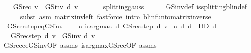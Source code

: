 \begin{isabellebody}
\ \ \isamarkupfalse%
\ {\isachardoublequoteopen}GS{\isacharunderscore}{\kern0pt}rec\ v\ {\isacharequal}{\kern0pt}\ GS{\isacharunderscore}{\kern0pt}inv\ d\ v{\isachardoublequoteclose}\ \isanewline
\ \ \ \ \isamarkupfalse%
\ splitting{\isacharunderscore}{\kern0pt}gauss\isanewline
\ \ \ \ \isamarkupfalse%
\ GS{\isacharunderscore}{\kern0pt}inv{\isacharunderscore}{\kern0pt}def\ is{\isacharunderscore}{\kern0pt}splitting{\isacharunderscore}{\kern0pt}blin{\isacharunderscore}{\kern0pt}def{\isacharprime}{\kern0pt}\isanewline
\ \ \ \ \isamarkupfalse%
\ {\isacharparenleft}{\kern0pt}subst\ {\isacharparenleft}{\kern0pt}asm{\isacharparenright}{\kern0pt}\ matrix{\isacharunderscore}{\kern0pt}inv{\isacharunderscore}{\kern0pt}left{\isacharparenright}{\kern0pt}\ {\isacharparenleft}{\kern0pt}fastforce\ intro{\isacharcolon}{\kern0pt}\ blinfun{\isacharunderscore}{\kern0pt}to{\isacharunderscore}{\kern0pt}matrix{\isacharunderscore}{\kern0pt}inverse{\isacharparenleft}{\kern0pt}{}{\isacharparenright}{\kern0pt}{\isacharparenright}{\kern0pt}{\isacharplus}{\kern0pt}\isanewline
{}\isamarkupfalse%
%
\endisatagproof
{\isafoldproof}%
%
\isadelimproof
\isanewline
%
\endisadelimproof
\isanewline
\isanewline
{}\isamarkupfalse%
\isanewline
\ \ GS{\isacharunderscore}{\kern0pt}rec{\isacharunderscore}{\kern0pt}step{\isacharunderscore}{\kern0pt}eq{\isacharunderscore}{\kern0pt}GS{\isacharunderscore}{\kern0pt}inv{\isacharcolon}{\kern0pt}\ \isanewline
\ \ \ {\isachardoublequoteopen}{\isasymAnd}s{\isachardot}{\kern0pt}\ is{\isacharunderscore}{\kern0pt}arg{\isacharunderscore}{\kern0pt}max\ {\isacharparenleft}{\kern0pt}{\isasymlambda}d{\isachardot}{\kern0pt}\ GS{\isacharunderscore}{\kern0pt}rec{\isacharunderscore}{\kern0pt}step\ d\ v\ {\isachardollar}{\kern0pt}\ s{\isacharparenright}{\kern0pt}\ {\isacharparenleft}{\kern0pt}{\isasymlambda}d{\isachardot}{\kern0pt}\ d\ {\isasymin}\ D\isactrlsub D{\isacharparenright}{\kern0pt}\ d{\isachardoublequoteclose}\isanewline
\ \ \ {\isachardoublequoteopen}GS{\isacharunderscore}{\kern0pt}rec{\isacharunderscore}{\kern0pt}step\ d\ v\ {\isacharequal}{\kern0pt}\ GS{\isacharunderscore}{\kern0pt}inv\ d\ v{\isachardoublequoteclose}\isanewline
%
\isadelimproof
\ \ %
\endisadelimproof
%
\isatagproof
{}\isamarkupfalse%
\ GS{\isacharunderscore}{\kern0pt}rec{\isacharunderscore}{\kern0pt}eq{\isacharunderscore}{\kern0pt}GS{\isacharunderscore}{\kern0pt}inv{\isacharbrackleft}{\kern0pt}OF\ assms{\isacharbrackright}{\kern0pt}\ is{\isacharunderscore}{\kern0pt}arg{\isacharunderscore}{\kern0pt}max{\isacharunderscore}{\kern0pt}GS{\isacharunderscore}{\kern0pt}rec{\isacharbrackleft}{\kern0pt}OF\ assms{\isacharbrackright}{\kern0pt}\isanewline

\end{isabellebody}
